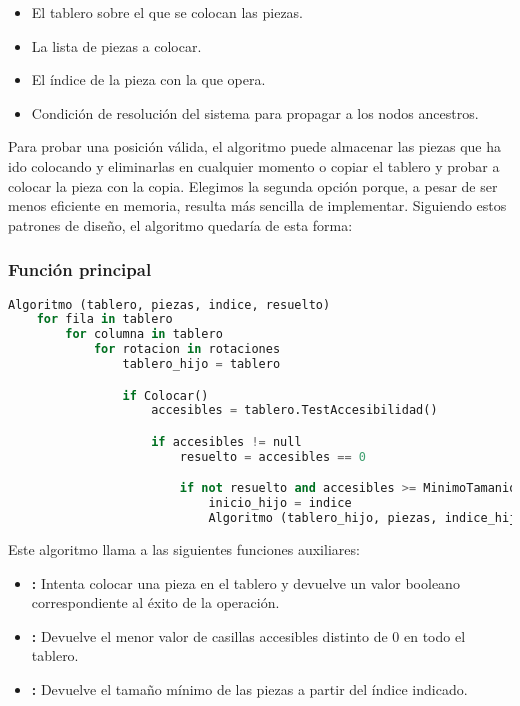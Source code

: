 \begin{itemize}
	\item El tablero sobre el que se colocan las piezas.
	\item La lista de piezas a colocar.
	\item El índice de la pieza con la que opera.
	\item Condición de resolución del sistema para propagar a los nodos ancestros.
\end{itemize}

Para probar una posición válida, el algoritmo puede almacenar las piezas que ha ido colocando y eliminarlas en cualquier momento o copiar el tablero y probar a colocar la pieza con la copia.
Elegimos la segunda opción porque, a pesar de ser menos eficiente en memoria, resulta más sencilla de implementar.
Siguiendo estos patrones de diseño, el algoritmo quedaría de esta forma:

\subsubsection{Función principal}

\begin{lstlisting}[language=Python]
Algoritmo (tablero, piezas, indice, resuelto)
	for fila in tablero
		for columna in tablero
			for rotacion in rotaciones
				tablero_hijo = tablero

				if Colocar()
					accesibles = tablero.TestAccesibilidad()

					if accesibles != null
						resuelto = accesibles == 0

						if not resuelto and accesibles >= MinimoTamanio(piezas, indice+1)
							inicio_hijo = indice
							Algoritmo (tablero_hijo, piezas, indice_hijo, resuelto)
\end{lstlisting}

Este algoritmo llama a las siguientes funciones auxiliares:

\begin{itemize}
	\item{}\textbf{:} Intenta colocar una pieza en el tablero y devuelve un valor booleano correspondiente al éxito de la operación.
	\item{}\textbf{:} Devuelve el menor valor de casillas accesibles distinto de $0$ en todo el tablero.
	\item{}\textbf{:} Devuelve el tamaño mínimo de las piezas a partir del índice indicado.
\end{itemize}

